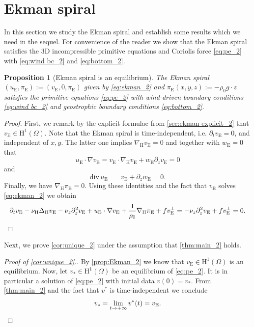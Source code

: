 \documentclass[preprint]{elsarticle}
\newtheorem{prop}[prop]{Proposition}
\numberwithin{equation}{section}
\DeclareMathOperator{\divH}{div_{\H}}
\renewcommand{\H}{\mathrm{H}}
\newcommand{\nablaH}{\nabla_{\H}}
\newcommand{\DeltaH}{\Delta_{\H}}
\newcommand{\rH}{\H}
\newcommand{\rE}{\mathrm{E}}
\renewcommand{\div}{\mathrm{div} \,}
\begin{document}
\section{Ekman spiral}
\label{sec:Ekman_2}

In this section we study the Ekman spiral and establish some results which we need in the sequel. 
For convenience of the reader we show that the Ekman spiral satisfies the 3D incompressible primitive equations and Coriolis force \eqref{eq:pe_2} with \eqref{eq:wind bc_2} and \eqref{eq:bottom_2}.

\begin{prop}[Ekman spiral is an equilibrium]\label{prop:Ekman_2}
	The Ekman spiral \\ $(u_{\rE},\pi_{\rE}) := (v_{\rE},0,\pi_{\rE})$ given by \eqref{eq:ekman_2} and $\pi_{\rE}(x,y,z) := - \rho_0 g \cdot z$ satisfies the primitive equations \eqref{eq:pe_2} with wind-driven boundary conditions \eqref{eq:wind bc_2} and geostrophic boundary conditions \eqref{eq:bottom_2}. 
\end{prop}
\begin{proof}
	First, we remark by the explicit formulae from \autoref{sec:ekman explicit_2} that $v_{\rE} \in \rH^1(\Omega)$.  
	Note that the Ekman spiral is time-independent, i.e. $\partial_t v_{\rE} = 0$, and independent of $x,y$. The latter one
	implies $\nablaH v_{\rE} = 0$ and together with $w_{\rE} =0$ that 
	\begin{equation*}
		u_{\rE} \cdot \nabla v_{\rE}
		= v_{\rE} \cdot \nablaH v_{\rE} + w_{\rE} \partial_z v_{\rE}
		= 0 
	\end{equation*}
	and
	\begin{equation*}
		\div u_{\rE} = \divH v_{\rE} + \partial_z w_{\rE}
		= 0 .
	\end{equation*}
	Finally, we have $\nablaH \pi_{\rE} = 0$. 
	Using these identities and the fact that $v_{\rE}$ solves \eqref{eq:ekman_2} we obtain
	\begin{equation*}
		\partial_t v_{\rE} - \nu_{\rH} \DeltaH v_{\rE} - \nu_z \partial_z^2 v_{\rE} + u_{\rE} \cdot \nabla v_{\rE} + \frac{1}{\rho_0}\nablaH \pi_{\rE} + f v_{\rE}^\perp
		= - \nu_z \partial_z^2 v_{\rE} + f v_{\rE}^\perp
		= 0 . \qedhere 
	\end{equation*}
\end{proof}

Next, we prove \autoref{cor:unique_2}
under the assumption that \autoref{thm:main_2} holds.

\begin{proof}[Proof of \autoref{cor:unique_2}.]
	By \autoref{prop:Ekman_2} we know that $v_{\rE} \in \rH^1(\Omega)$ is an equilibrium. 	
	Now, let $v_* \in \rH^1(\Omega)$ be an equilibrium of \eqref{eq:pe_2}. It is in particular a solution of \eqref{eq:pe_2} with initial data $v(0) = v_\ast$. From \autoref{thm:main_2} and the fact that $v^\ast$ is time-independent we conclude
	\begin{equation*}
		v_\ast = \lim_{t\to+\infty}v^\ast(t) = v_{\rE} .
		\qedhere 
	\end{equation*}
\end{proof}
\end{document}

